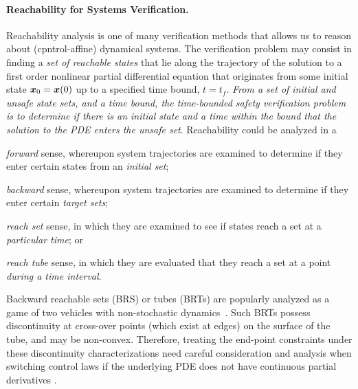 \paragraph{Reachability for Systems Verification.}
Reachability analysis is one of many verification methods that allows us to reason about (cpntrol-affine) dynamical systems. 
The verification problem may consist in finding a \textit{set of reachable states} that lie along the trajectory of the solution to a first order nonlinear partial differential equation that originates from some initial state $\bm{x}_0 = \bm{x}(0)$ up to a specified time bound, $t=t_f$. 
\textit{From a set of initial and unsafe state sets, and a time bound, the time-bounded safety verification problem is to determine if there is an initial state and a time within the bound that the solution to the PDE enters the unsafe set}.
Reachability could be analyzed in a 
%
\begin{inparaenum}[(i)]
	\item \textit{forward} sense, whereupon system trajectories are examined to determine if they enter certain states from an \textit{initial set};
	\item \textit{backward} sense, whereupon system trajectories are examined to determine if they enter certain \textit{target sets};
	\item \textit{reach set} sense, in which they are examined to see if states reach a set at a \textit{particular time}; or
	\item \textit{reach tube} sense, in which they are evaluated that they reach a set at a point \textit{during a time interval}.	
\end{inparaenum} 

Backward reachable sets (BRS) or tubes (BRTs) are popularly analyzed as a game of two vehicles with non-stochastic dynamics~\citet{Merz1972}. 
Such BRTs possess discontinuity at cross-over points (which exist at edges) on the surface of the  tube, and may be non-convex. 
Therefore, treating the end-point constraints under these discontinuity characterizations need careful consideration and analysis when switching control laws if the underlying PDE does not have continuous partial  derivatives . 

